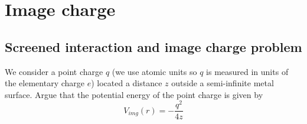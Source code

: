 \section{Image charge}
\subsection{Screened interaction and image charge problem}

\begin{exercise}
We consider a point charge $q$ (we use atomic units so $q$ is measured in units of the elementary charge $e$) located a distance $z$ outside a semi-infinite metal surface. Argue that the potential energy of the point charge is given by
\begin{equation}
    V_{img}(r) = - \frac{q^2}{4z}
\end{equation}
\end{exercise}

